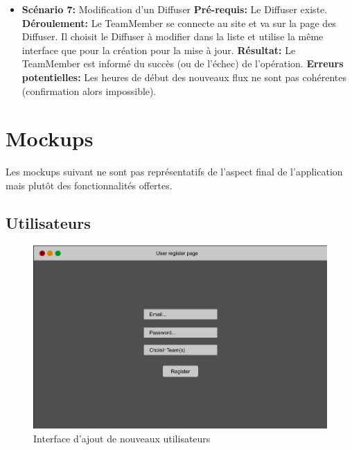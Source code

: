 \documentclass[french]{article}
\begin{document}
\begin{itemize}
			\item \textbf{Scénario 7:} Modification d'un Diffuser \newline
			\textbf{Pré-requis:} Le Diffuser existe.\newline
			\textbf{Déroulement:} Le TeamMember se connecte au site et va sur la page des Diffuser. Il choisit le Diffuser à modifier dans la liste et utilise la même interface que pour la création pour la mise à jour. \newline
			\textbf{Résultat:} Le TeamMember est informé du succès (ou de l'échec) de l'opération.\newline
			\textbf{Erreurs potentielles:} Les heures de début des nouveaux flux ne sont pas cohérentes (confirmation alors impossible). \newline

		\end{itemize}

\newpage		
\section{Mockups}
Les mockups suivant ne sont pas représentatifs de l'aspect final de l'application mais plutôt des fonctionnalités offertes.

\subsection{Utilisateurs}

	\begin{figure}[h]
		\centering
		\includegraphics[scale=0.4]{mockup/m_user_register}
		\caption{Interface d'ajout de nouveaux utilisateurs}
		\label{fig:userRegister}
	\end{figure}
	
\end{document}
